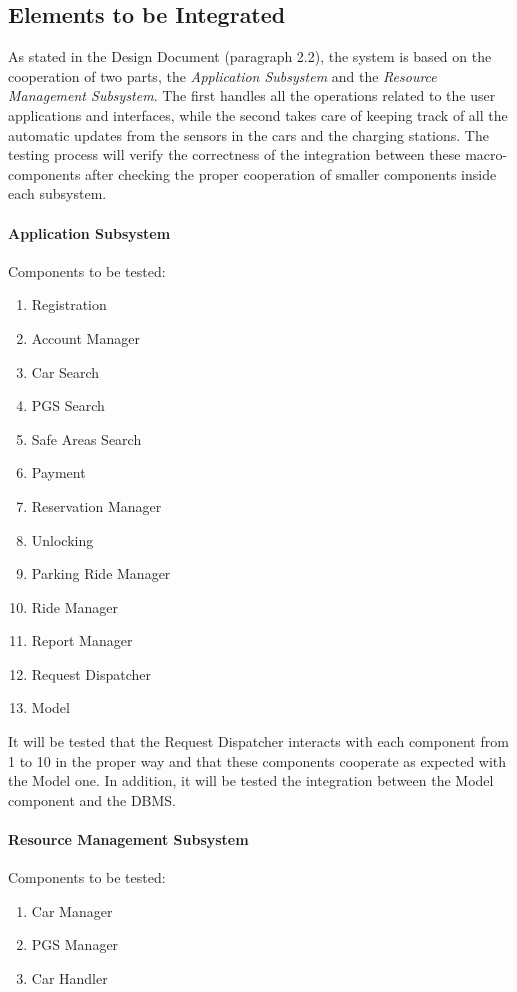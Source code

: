 \documentclass[english]{article}
\begin{document}
\subsection{Elements to be Integrated}

As stated in the Design Document (paragraph 2.2), the system is based on the cooperation of two parts, the \emph{Application Subsystem}  and the \emph{Resource Management Subsystem}. The first handles all the operations related to the user applications and interfaces, while the second takes care of keeping track of all the automatic updates from the sensors in the cars and the charging stations.
The testing process will verify the correctness of the integration between these macro-components after checking the proper cooperation of smaller components inside each subsystem.

\paragraph{Application Subsystem}
Components to be tested:
\begin{enumerate}
\item Registration
\item Account Manager
\item Car Search
\item PGS Search
\item Safe Areas Search
\item Payment
\item Reservation Manager
\item Unlocking
\item Parking Ride Manager
\item Ride Manager
\item Report Manager
\item Request Dispatcher
\item Model
\end{enumerate}

It will be tested that the Request Dispatcher interacts with each component from 1 to 10 in the proper way and that these components cooperate as expected with the Model one. In addition, it will be tested the integration between the Model component and the DBMS.

\paragraph{Resource Management Subsystem}
Components to be tested:
\begin{enumerate}
\item Car Manager
\item PGS Manager
\item Car Handler
\end{enumerate}
\end{document}
